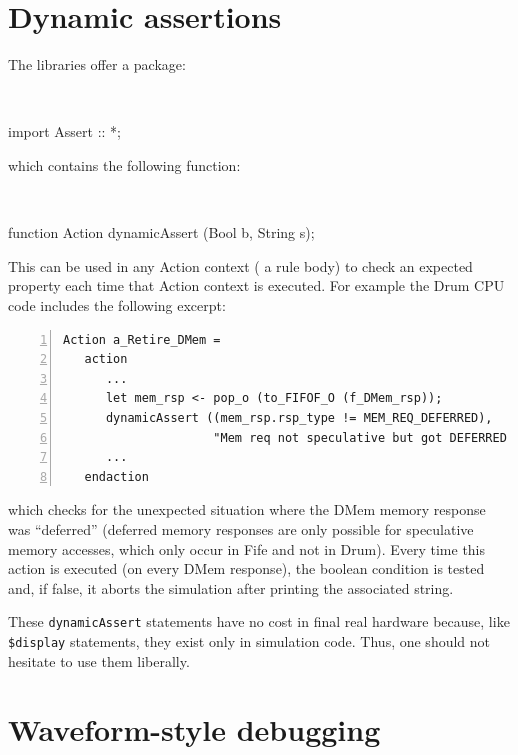 \section{Dynamic assertions}


The {\BSV} libraries offer a package:

{\tt
\begin{tabbing}
\hmmm import Assert :: *;
\end{tabbing}
}

which contains the following function:

{\tt
\begin{tabbing}
\hmmm function Action dynamicAssert (Bool b, String s);
\end{tabbing}
}

This can be used in any Action context ({\eg} a rule body) to check an
expected property each time that Action context is executed.  For
example the Drum CPU code includes the following excerpt:

{\footnotesize
\begin{Verbatim}[frame=single, numbers=left, label=src\_Drum/CPU.bsv]
   Action a_Retire_DMem =
   action
      ...
      let mem_rsp <- pop_o (to_FIFOF_O (f_DMem_rsp));
      dynamicAssert ((mem_rsp.rsp_type != MEM_REQ_DEFERRED),
                     "Mem req not speculative but got DEFERRED mem response");
      ...
   endaction
\end{Verbatim}
}

which checks for the unexpected situation where the DMem memory
response was ``deferred'' (deferred memory responses are only possible
for speculative memory accesses, which only occur in Fife and not in
Drum).  Every time this action is executed (on every DMem response),
the boolean condition is tested and, if false, it aborts the
simulation after printing the associated string.

These \verb|dynamicAssert| statements have no cost in final real
hardware because, like \verb|$display| statements, they exist only in
simulation code.  Thus, one should not hesitate to use them liberally.


\section{Waveform-style debugging}

